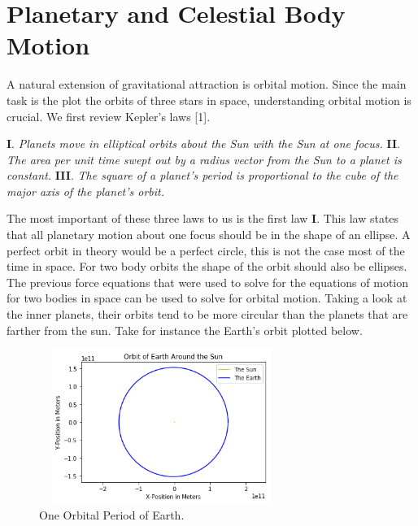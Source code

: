 \documentclass[twocolumn]{article}
\begin{document}
\section{Planetary and Celestial Body Motion}
A natural extension of gravitational attraction is orbital motion. Since the main task is the plot the orbits of three stars in space, understanding orbital motion is crucial. We first review Kepler's laws [1].
\begin{center}
\textbf{I}. \small{\textit{Planets move in elliptical orbits about the Sun with the Sun at one focus.}} \newline
\textbf{II}. \small{\textit{The area per unit time swept out by a radius vector from the Sun to a planet is constant.}} \newline
\textbf{III}. \small{\textit{The square of a planet's period is proportional to the cube of the major axis of the planet's orbit.}} \newline
\end{center}
The most important of these three laws to us is the first law \textbf{I}. This law states that all planetary motion about one focus should be in the shape of an ellipse. A perfect orbit in theory would be a perfect circle, this is not the case most of the time in space. For two body orbits the shape of the orbit should also be ellipses. The previous force equations that were used to solve for the equations of motion for two bodies in space can be used to solve for orbital motion. Taking a look at the inner planets, their orbits tend to be more circular than the planets that are farther from the sun. Take for instance the Earth's orbit plotted below.
\newpage
\begin{figure}[h]
    \centering
    \includegraphics[width=8cm, height=5cm]{Figures/Earth Orbit.png}
    \caption{\small{One Orbital Period of Earth.}}
    \label{Fig. Earth Orbit}
\end{figure}
\end{document}
